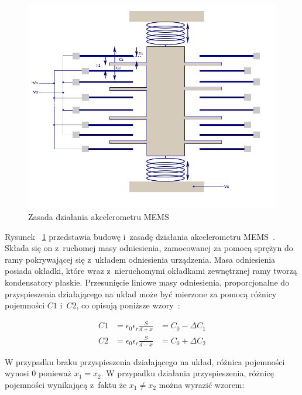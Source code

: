 \begin{figure}[H]
	\centering
	\includegraphics[scale=0.4]{Pictures/MEMS-Accelerometer_struct.png}
		\caption[Zasada działania akcelerometru MEMS]{Zasada działania akcelerometru MEMS}
	\label{fig:MEMS-Accelerometer_struct}
\end{figure}

Rysunek ~\ref{fig:MEMS-Accelerometer_struct} przedstawia budowę i~zasadę działania akcelerometru MEMS~\cite{mems12, mems13}. Składa się on z~ruchomej masy odniesienia, zamocowanej za pomocą sprężyn do ramy pokrywającej się z~układem odniesienia urządzenia. Masa odniesienia posiada okładki, które wraz z~nieruchomymi okładkami zewnętrznej ramy tworzą kondensatory płaskie. Przesunięcie liniowe masy odniesienia, proporcjonalne do przyspieszenia działającego na układ może być mierzone za pomocą różnicy pojemności $C1$ i~$C2$, co opisują poniższe wzory~\cite{mems12}:

\begin{equation}
\begin{aligned}
C1 &= \epsilon_0\epsilon_r\frac{S}{d + x} &= C_0 - \Delta{C_1} \\
C2 &= \epsilon_0\epsilon_r\frac{S}{d - x} &= C_0 + \Delta{C_2}
\end{aligned}
\label{C_to_delta}
\end{equation} 

W przypadku braku przyspieszenia działającego na układ, różnica pojemności wynosi $0$ ponieważ $x_1 = x_2$. W przypadku działania przyspieszenia, różnicę pojemności wynikającą z~faktu że $x_1 \neq x_2$ można wyrazić wzorem:

